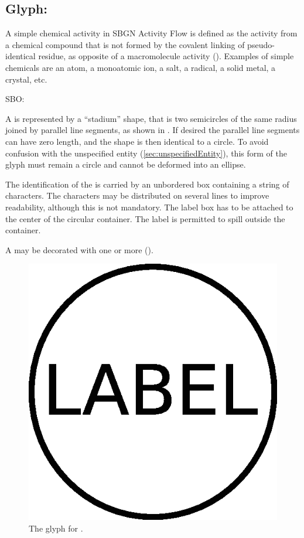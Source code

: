 \subsection{Glyph: }
\label{sec:af:simpleChemicalActivity}

A simple chemical activity in SBGN Activity Flow is defined as the activity from a chemical compound that is not formed by the covalent linking of pseudo-identical residue, as opposite of a macromolecule activity (). Examples of simple chemicals are an atom, a monoatomic ion, a salt, a radical, a solid metal, a crystal, etc.

\begin{glyphDescription}

\glyphSboTerm SBO:

\glyphContainer A  is represented by a “stadium” shape, that is two semicircles of the same
radius joined by parallel line segments, as shown in . If desired the parallel line segments can have zero length, and the shape is then identical to a circle. To avoid confusion with the unspecified entity (\ref{sec:unspecifiedEntity}), this form of the glyph must remain a circle and cannot be deformed into an ellipse.

\glyphLabel The identification of the  is carried by an unbordered box containing a string of characters.  The characters may be distributed on several lines to improve readability, although this is not mandatory.  The label box has to be attached to the center of the circular container.  The label is permitted to spill outside the container.

\glyphAux A  may be decorated with one or more  (). 

\end{glyphDescription}

\begin{figure}[H]
  \centering
  \includegraphics[scale = 0.3]{images/simpleChemical}
  \caption{The \AF glyph for .}
  \label{fig:af:simpleChemicalActivity}
\end{figure}

